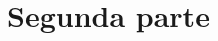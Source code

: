 \begin{Solucion}
  
\end{Solucion}

\begin{Problema}{7}
  
\end{Problema}

\begin{Solucion}
  
\end{Solucion}

\begin{Problema}{8}
  
\end{Problema}

\begin{Solucion}
  
\end{Solucion}

\begin{Problema}{9}
  
\end{Problema}

\begin{Solucion}
  
\end{Solucion}

\begin{Problema}{10}
  
\end{Problema}

\begin{Solucion}
  
\end{Solucion}

\section{Segunda parte}
\label{sec:segunda-parte}

\begin{Problema}{11}
  
\end{Problema}

\begin{Solucion}
  
\end{Solucion}

\begin{Problema}{12}
  
\end{Problema}

\begin{Solucion}
  
\end{Solucion}

\begin{Problema}{13}
  
\end{Problema}

\begin{Solucion}
  
\end{Solucion}



